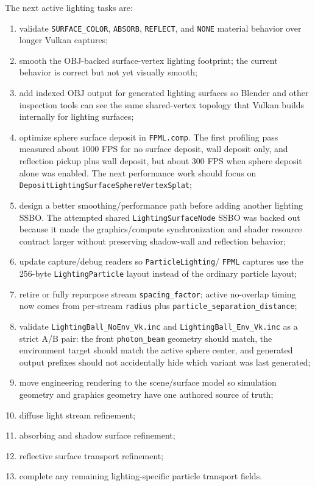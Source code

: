The next active lighting tasks are:
\begin{enumerate}
    \item validate \texttt{SURFACE\_COLOR}, \texttt{ABSORB},
          \texttt{REFLECT}, and \texttt{NONE} material behavior over longer
          Vulkan captures;
    \item smooth the OBJ-backed surface-vertex lighting footprint; the
          current behavior is correct but not yet visually smooth;
    \item add indexed OBJ output for generated lighting surfaces so Blender
          and other inspection tools can see the same shared-vertex topology
          that Vulkan builds internally for lighting surfaces;
    \item optimize sphere surface deposit in \texttt{FPML.comp}.  The first
          profiling pass measured about \(1000\) FPS for no surface deposit,
          wall deposit only, and reflection pickup plus wall deposit, but
          about \(300\) FPS when sphere deposit alone was enabled.  The next
          performance work should focus on
          \texttt{DepositLightingSurfaceSphereVertexSplat};
    \item design a better smoothing/performance path before adding another
          lighting SSBO.  The attempted shared
          \texttt{LightingSurfaceNode} SSBO was backed out because it made
          the graphics/compute synchronization and shader resource contract
          larger without preserving shadow-wall and reflection behavior;
    \item update capture/debug readers so \texttt{ParticleLighting}/
          \texttt{FPML} captures use the \(256\)-byte
          \texttt{LightingParticle} layout instead of the ordinary particle
          layout;
    \item retire or fully repurpose stream \texttt{spacing\_factor}; active
          no-overlap timing now comes from per-stream
          \texttt{radius} plus
          \texttt{particle\_separation\_distance};
    \item validate \texttt{LightingBall\_NoEnv\_Vk.inc} and
          \texttt{LightingBall\_Env\_Vk.inc} as a strict A/B pair: the front
          \texttt{photon\_beam} geometry should match, the environment target
          should match the active sphere center, and generated output prefixes
          should not accidentally hide which variant was last generated;
    \item move engineering rendering to the scene/surface model so simulation
          geometry and graphics geometry have one authored source of truth;
    \item diffuse light stream refinement;
    \item absorbing and shadow surface refinement;
    \item reflective surface transport refinement;
    \item complete any remaining lighting-specific particle transport fields.
\end{enumerate}


